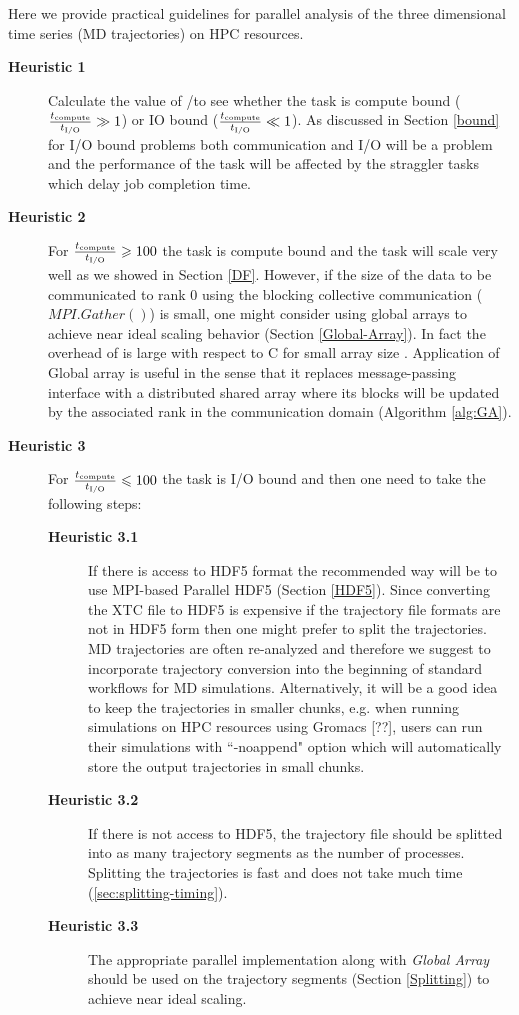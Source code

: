 \label{guideline}
Here we provide practical guidelines for parallel analysis of the three dimensional time series (MD trajectories) on HPC resources.

\begin{description}
  \item[\textbf{Heuristic 1}] Calculate the value of \tcomp/\tIO to see whether the task is compute bound ($\frac{{t}_{\text{compute}}}{{t}_{\text{I/O}}} \gg 1$) or IO bound ($\frac{{t}_{\text{compute}}}{{t}_{\text{I/O}}} \ll 1$). As discussed in Section \ref{bound} for I/O bound problems both communication and I/O will be a problem and the performance of the task will be affected by the straggler tasks which delay job completion time.  
  
  \item[\textbf{Heuristic 2}] For $\frac{{t}_{\text{compute}}}{{t}_{\text{I/O}}} \geqslant 100$ the task is compute bound and the task will scale very well as we showed in Section \ref{DF}. However, if the size of the data to be communicated to rank 0 using the blocking collective communication ($MPI.Gather()$) is small, one might consider using global arrays to achieve near ideal scaling behavior (Section \ref{Global-Array}). In fact the overhead of  is large with respect to C for small array size \cite{Dalcin:2011aa}. Application of Global array is useful in the sense that it replaces message-passing interface with a distributed shared array where its blocks will be updated by the associated rank in the communication domain (Algorithm \ref{alg:GA}). 
  \item[\textbf{Heuristic 3}] For $\frac{{t}_{\text{compute}}}{{t}_{\text{I/O}}} \leqslant 100$ the task is I/O bound and then one need to take the following steps:
   
\begin{description}
  \item[\textbf{Heuristic 3.1}] If there is access to HDF5 format the recommended way will be to use MPI-based Parallel HDF5 (Section \ref{HDF5}). Since converting the XTC file to HDF5 is expensive if the trajectory file formats are not in HDF5 form then one might prefer to split the trajectories. MD trajectories are often re-analyzed and therefore we suggest to incorporate trajectory conversion into the beginning of standard workflows for MD simulations. 
 Alternatively, it will be a good idea to keep the trajectories in smaller chunks, e.g. when running simulations on HPC resources using Gromacs [??], users can run their simulations with ``-noappend" option which will automatically store the output trajectories in small chunks.
  \item[\textbf{Heuristic 3.2}] If there is not access to HDF5, the trajectory file should be splitted into as many trajectory segments as the number of processes. Splitting the trajectories is fast and does not take much time (\ref{sec:splitting-timing}).
  \item[\textbf{Heuristic 3.3}] The appropriate parallel implementation along with \emph{Global Array} should be used on the trajectory segments (Section \ref{Splitting}) to achieve near ideal scaling.
\end{description}
\end{description}
